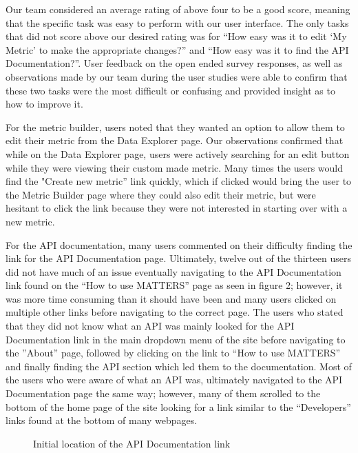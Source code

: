 		Our team considered an average rating of above four to be a good score, 
		meaning that the specific task was easy to perform with our user interface.
		The only tasks that did not score above our desired rating was for 
		“How easy was it to edit ‘My Metric’ to make the appropriate changes?” 
		and “How easy was it to find the API Documentation?”. User feedback on the 
		open ended survey responses, as well as observations made by our team during 
		the user studies were able to confirm that these two tasks were the most 
		difficult or confusing and provided insight as to how to improve it.
		
		For the metric builder, users noted that they wanted an option to 
		allow them to edit their metric from the Data Explorer page. 
		Our observations confirmed that while on the Data Explorer page, 
		users were actively searching for an edit button while they were 
		viewing their custom made metric. Many times the users would find the 
		"Create new metric” link quickly, which if clicked would bring the 
		user to the Metric Builder page where they could also edit their metric, 
		but were hesitant to click the link because they were not 
		interested in starting over with a new metric.
		
		For the API documentation, many users commented on their difficulty finding 
		the link for the API Documentation page. Ultimately, twelve out of the thirteen 
		users did not have much of an issue eventually navigating to the API Documentation 
		link found on the “How to use MATTERS” page as seen in figure 2; however, it was more 
		time consuming than it should have been and many users clicked on multiple other 
		links before navigating to the correct page. The users who stated that they did not 
		know what an API was mainly looked for the API Documentation link in the main dropdown 
		menu of the site before navigating to the ”About” page, followed by clicking on the 
		link to “How to use MATTERS” and finally finding the API section which led them to 
		the documentation. Most of the users who were aware of what an API was, ultimately 
		navigated to the API Documentation page the same way; however, many of them scrolled 
		to the bottom of the home page of the site looking for a link similar to the “Developers” 
		links found at the bottom of many webpages.
		
			\begin{figure}[t]
				\centering
				\caption{Initial location of the API Documentation link}
			\end{figure}
		
